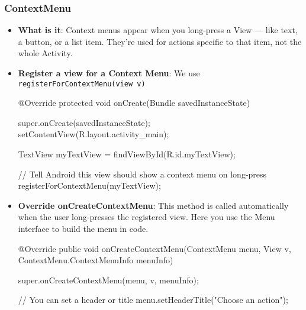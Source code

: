\documentclass{report}
\begin{document}
    \subsubsection{ContextMenu}
    \begin{itemize}
        \item \textbf{What is it}: Context menus appear when you long-press a View — like text, a button, or a list item. They’re used for actions specific to that item, not the whole Activity.
        \item \textbf{Register a view for a Context Menu}: We use \texttt{registerForContextMenu(view v)}
            \bigbreak \noindent 
            \begin{javacode}
                @Override
                protected void onCreate(Bundle savedInstanceState) {
                    super.onCreate(savedInstanceState);
                    setContentView(R.layout.activity_main);

                    TextView myTextView = findViewById(R.id.myTextView);

                    // Tell Android this view should show a context menu on long-press
                    registerForContextMenu(myTextView);
                }
            \end{javacode}
        \item \textbf{Override onCreateContextMenu}: This method is called automatically when the user long-presses the registered view. Here you use the Menu interface to build the menu in code.
            \bigbreak \noindent 
            \begin{javacode}
                @Override
                public void onCreateContextMenu(ContextMenu menu, View v,
                                                ContextMenu.ContextMenuInfo menuInfo) {
                    super.onCreateContextMenu(menu, v, menuInfo);

                    // You can set a header or title
                    menu.setHeaderTitle("Choose an action");

}
\end{javacode}
\end{itemize}
\end{document}
